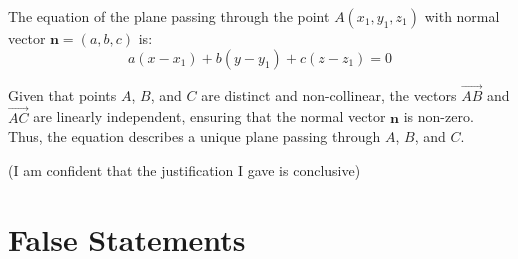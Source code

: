 \documentclass{article}
\begin{document}
\begin{enumerate}
          The equation of the plane passing through the point \(A(x_1, y_1, z_1)\) with normal vector \(\mathbf{n} = (a, b, c)\) is:
          \[
              a(x - x_1) + b(y - y_1) + c(z - z_1) = 0
          \]

          Given that points \(A\), \(B\), and \(C\) are distinct and non-collinear, the vectors \(\overrightarrow{AB}\) and \(\overrightarrow{AC}\) are linearly independent, ensuring that the normal vector \(\mathbf{n}\) is non-zero. Thus, the equation describes a unique plane passing through \(A\), \(B\), and \(C\).

          (I am confident that the justification I gave is conclusive)
\end{enumerate}

\section{False Statements}
\end{document}
